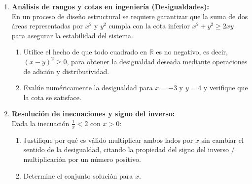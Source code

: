 \begin{enumerate}
    
    Identifique los axiomas que se aplicaron en cada paso del desarrollo.

    \newpage

    \item \textbf{Análisis de rangos y cotas en ingeniería (Desigualdades):}\\
    En un proceso de diseño estructural se requiere garantizar que la suma de dos áreas representadas por $x^2$ y $y^2$ cumpla con la cota inferior $x^2 + y^2 \ge 2xy$ para asegurar la estabilidad del sistema.
    \begin{enumerate}
        \item Utilice el hecho de que todo cuadrado en $\mathbb{R}$ es no negativo, es decir, $(x - y)^2 \ge 0$, para obtener la desigualdad deseada mediante operaciones de adición y distributividad.
        \item Evalúe numéricamente la desigualdad para $x = -3$ y $y = 4$ y verifique que la cota se satisface.
    \end{enumerate}

    \item \textbf{Resolución de inecuaciones y signo del inverso:}\\
    Dada la inecuación $\frac{1}{x} < 2$ con $x > 0$:
    \begin{enumerate}
        \item Justifique por qué es válido multiplicar ambos lados por $x$ sin cambiar el sentido de la desigualdad, citando la propiedad del signo del inverso / multiplicación por un número positivo.
        \item Determine el conjunto solución para $x$.
    \end{enumerate}
\end{enumerate}
